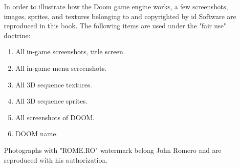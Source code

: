 In order to illustrate how the Doom game engine works, a few screenshots, images, sprites, and textures belonging to and copyrighted by id Software are reproduced in this book. The following items are used under the "fair use" doctrine:\\
\par
\begin{enumerate}
	\item All in-game screenshots, title screen.
	\item All in-game menu screenshots.
	\item All 3D sequence textures.
    \item All 3D sequence sprites.
    \item All screenshots of DOOM.
    \item DOOM name.
\end{enumerate}
\par
Photographs with "ROME.RO" watermark belong John Romero and are reproduced with his authorization.
